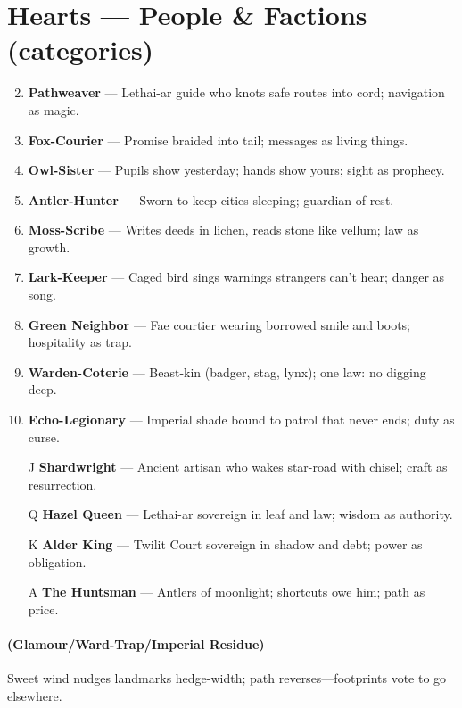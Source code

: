 \section*{Hearts --- People \& Factions (categories)}
\label{sec:valewood-people}
\begin{enumerate}
\setcounter{enumi}{1}
\item \textbf{Pathweaver} --- Lethai-ar guide who knots safe routes into cord; navigation as magic.
\item \textbf{Fox-Courier} --- Promise braided into tail; messages as living things.
\item \textbf{Owl-Sister} --- Pupils show yesterday; hands show yours; sight as prophecy.
\item \textbf{Antler-Hunter} --- Sworn to keep cities sleeping; guardian of rest.
\item \textbf{Moss-Scribe} --- Writes deeds in lichen, reads stone like vellum; law as growth.
\item \textbf{Lark-Keeper} --- Caged bird sings warnings strangers can't hear; danger as song.
\item \textbf{Green Neighbor} --- Fae courtier wearing borrowed smile and boots; hospitality as trap.
\item \textbf{Warden-Coterie} --- Beast-kin (badger, stag, lynx); one law: no digging deep.
\item \textbf{Echo-Legionary} --- Imperial shade bound to patrol that never ends; duty as curse.
\item[J] \textbf{Shardwright} --- Ancient artisan who wakes star-road with chisel; craft as resurrection.
\item[Q] \textbf{Hazel Queen} --- Lethai-ar sovereign in leaf and law; wisdom as authority.
\item[K] \textbf{Alder King} --- Twilit Court sovereign in shadow and debt; power as obligation.
\item[A] \textbf{The Huntsman} --- Antlers of moonlight; shortcuts owe him; path as price.
\end{enumerate}

\paragraph*{(Glamour/Ward-Trap/Imperial Residue)} Sweet wind nudges landmarks hedge-width; path reverses---footprints vote to go elsewhere.

